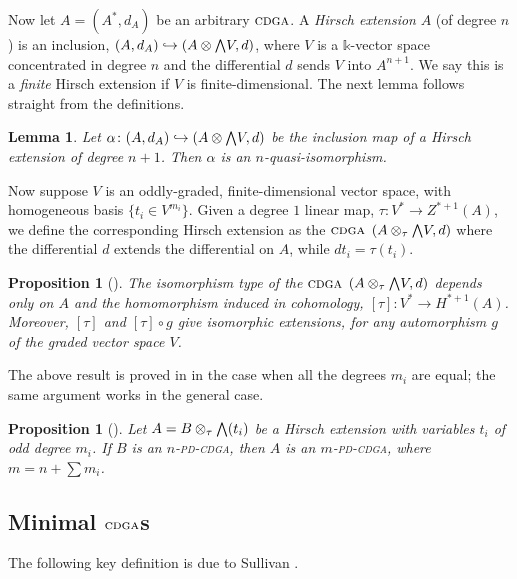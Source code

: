 \documentclass{article}
\numberwithin{equation}{section}
\newtheorem{lemma}[theorem]{Lemma}
\newtheorem{proposition}[theorem]{Proposition}
\theoremstyle{definition}
\renewcommand{\k}{\mathbb{k}}
\newcommand{\cdga}{\ensuremath{\textsc{cdga}}}
\newcommand{\inj}{\hookrightarrow}
\newcommand{\bwedge}{\mbox{\normalsize $\bigwedge$}}
\begin{document}
Now let $A=(A^*,d_A)$ be an arbitrary $\cdga$. 
A {\em Hirsch extension}\/ $A$ (of degree $n$) is an inclusion, 
$(A,d_A)\inj \left(A\otimes \bwedge V,d\right)$, where 
$V$ is a $\k$-vector space concentrated in 
degree $n$ and the differential $d$ sends $V$ into $A^{n+1}$. 
We say this is a {\em finite}\/ Hirsch extension if $V$  
is finite-dimensional.  The next lemma follows straight 
from the definitions.

\begin{lemma}
\label{lem:hi}
Let $\alpha\colon (A,d_A)\inj (A\otimes \bwedge V,d)$ be the 
inclusion map of a Hirsch extension of degree $n+1$.  
Then $\alpha$ is an $n$-quasi-isomorphism.  
\end{lemma}

Now suppose $V$ is an oddly-graded, finite-dimensional 
vector space, with homogeneous basis $\{ t_i \in V^{m_i} \}$. Given a 
degree $1$ linear map, $\tau\colon V^{*} \to Z^{*+1} (A)$, 
we define the corresponding Hirsch extension as the $\cdga$ 
$\left(A\otimes_{\tau} \bwedge V , d\right)$ where the differential 
$d$ extends the differential on $A$, while $dt_i=\tau (t_i)$. 

\begin{proposition}[\cite{Le}]
\label{prop:hirsch}
The isomorphism type of the $\cdga$  $(A\otimes_{\tau} \bwedge V, d)$ 
depends only on $A$ and the homomorphism 
induced in cohomology, $[\tau ]\colon V^{*} \to H^{* +1} (A)$. 
Moreover, $[\tau ]$ and $[\tau ]\circ g$ give isomorphic extensions, for any
automorphism $g$ of the graded vector space $V$.
\end{proposition}

The above result is proved in \cite[Lemmas II.2 and II.3] {Le} 
in the case when all the degrees $m_i$ are equal;  
the same argument works in the general case.

\begin{proposition}[\cite{PS-imrn19}]
\label{prop:circlepd}
Let $A= B \otimes_{\tau} \bwedge (t_i)$ be a Hirsch extension with 
variables $t_i$ of odd degree $m_i$. If $B$ is an $n$-\textsc{pd-cdga}, then
$A$ is an $m$-\textsc{pd-cdga}, where $m=n+ \sum m_i$.
\end{proposition}

\subsection{Minimal $\cdga$s}
\label{subsec:min-cdga}
The following key definition is due to Sullivan \cite{Sullivan77}.
\end{document}
